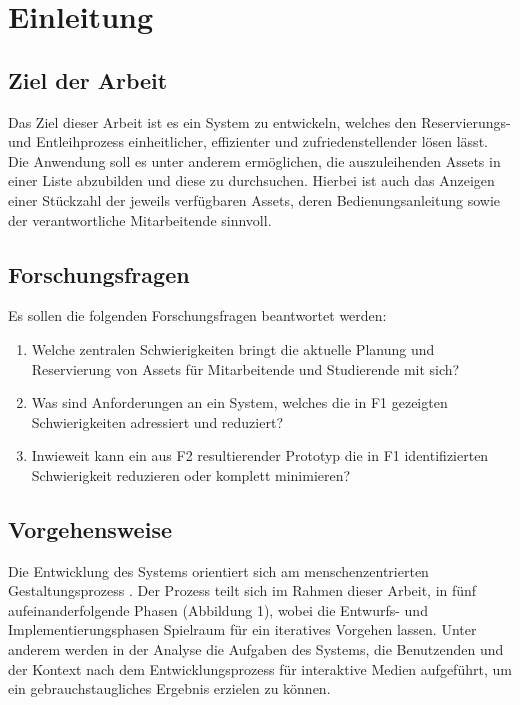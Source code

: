 
\chapter{Einleitung}


\section{Ziel der Arbeit}
Das Ziel dieser Arbeit ist es ein System zu entwickeln, welches den Reservierungs- und
Entleihprozess einheitlicher, effizienter und zufriedenstellender lösen lässt. Die Anwendung soll es
unter anderem ermöglichen, die auszuleihenden Assets in einer Liste abzubilden und diese zu
durchsuchen. Hierbei ist auch das Anzeigen einer Stückzahl der jeweils verfügbaren Assets, deren
Bedienungsanleitung sowie der verantwortliche Mitarbeitende sinnvoll.

\section{Forschungsfragen}
Es sollen die folgenden Forschungsfragen beantwortet werden:

\begin{enumerate}
  \item[\sffamily\color{maincolor} {F1}] {Welche zentralen Schwierigkeiten bringt die aktuelle Planung und Reservierung von Assets für Mitarbeitende und Studierende mit sich?}
  \item[\sffamily\color{maincolor} {F2}] {Was sind Anforderungen an ein System, welches die in F1 gezeigten Schwierigkeiten adressiert und reduziert?}
  \item[\sffamily\color{maincolor} {F3}] {Inwieweit kann ein aus F2 resultierender Prototyp die in F1 identifizierten Schwierigkeit reduzieren oder komplett minimieren?}
\end{enumerate}


\section{Vorgehensweise}
Die Entwicklung des Systems orientiert sich am menschenzentrierten Gestaltungsprozess
\cite{din_en_iso_9421-2102020-03_din_nodate}. Der Prozess teilt sich im Rahmen dieser Arbeit, in
fünf aufeinanderfolgende Phasen (Abbildung 1), wobei die Entwurfs- und Implementierungsphasen
Spielraum für ein iteratives Vorgehen lassen. Unter anderem werden in der Analyse die Aufgaben des
Systems, die Benutzenden und der Kontext nach dem Entwicklungsprozess für interaktive Medien
\cite{herczeg_einfuhrung_2009} aufgeführt, um ein gebrauchstaugliches Ergebnis erzielen zu können.

